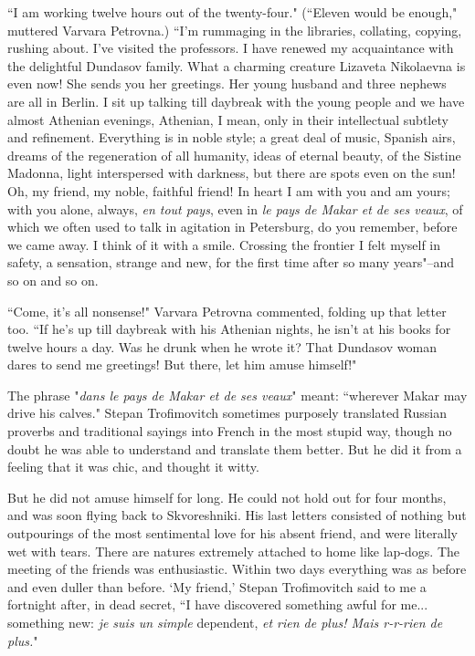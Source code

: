 \documentclass[12pt]{article}
\begin{document}
\vspace{12pt}
``I am working twelve hours out of the twenty-four." (``Eleven would be
enough," muttered Varvara Petrovna.) ``I'm rummaging in the libraries,
collating, copying, rushing about. I've visited the professors. I have
renewed my acquaintance with the delightful Dundasov family. What a
charming creature Lizaveta Nikolaevna is even now! She sends you her
greetings. Her young husband and three nephews are all in Berlin. I
sit up talking till daybreak with the young people and we have almost
Athenian evenings, Athenian, I mean, only in their intellectual subtlety
and refinement. Everything is in noble style; a great deal of music,
Spanish airs, dreams of the regeneration of all humanity, ideas
of eternal beauty, of the Sistine Madonna, light interspersed with
darkness, but there are spots even on the sun! Oh, my friend, my noble,
faithful friend! In heart I am with you and am yours; with you alone,
always, \emph{en tout pays}, even in \emph{le pays de Makar et de ses veaux}, of
which we often used to talk in agitation in Petersburg, do you remember,
before we came away. I think of it with a smile. Crossing the frontier I
felt myself in safety, a sensation, strange and new, for the first time
after so many years"--and so on and so on.


\vspace{12pt}
``Come, it's all nonsense!" Varvara Petrovna commented, folding up that
letter too. ``If he's up till daybreak with his Athenian nights, he isn't
at his books for twelve hours a day. Was he drunk when he wrote it?
That Dundasov woman dares to send me greetings! But there, let him amuse
himself!"


\vspace{12pt}
The phrase "\emph{dans le pays de Makar et de ses veaux}" meant: ``wherever
Makar may drive his calves." Stepan Trofimovitch sometimes purposely
translated Russian proverbs and traditional sayings into French in the
most stupid way, though no doubt he was able to understand and translate
them better. But he did it from a feeling that it was chic, and thought
it witty.


\vspace{12pt}
But he did not amuse himself for long. He could not hold out for four
months, and was soon flying back to Skvoreshniki. His last letters
consisted of nothing but outpourings of the most sentimental love for
his absent friend, and were literally wet with tears. There are natures
extremely attached to home like lap-dogs. The meeting of the friends was
enthusiastic. Within two days everything was as before and even duller
than before. `My friend,' Stepan Trofimovitch said to me a fortnight
after, in dead secret, ``I have discovered something awful for me...
something new: \emph{je suis un simple} dependent, \emph{et rien de plus! Mais
r-r-rien de plus.}"
\end{document}
